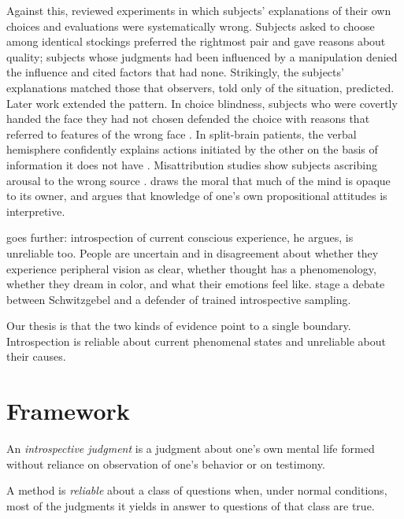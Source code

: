 \documentclass{situationist-preprint}
\begin{document}
Against this, \citet{Nisbett1977} reviewed experiments in which subjects' explanations of their own choices and evaluations were systematically wrong. Subjects asked to choose among identical stockings preferred the rightmost pair and gave reasons about quality; subjects whose judgments had been influenced by a manipulation denied the influence and cited factors that had none. Strikingly, the subjects' explanations matched those that observers, told only of the situation, predicted. Later work extended the pattern. In choice blindness, subjects who were covertly handed the face they had not chosen defended the choice with reasons that referred to features of the wrong face \citep{Johansson2005}. In split-brain patients, the verbal hemisphere confidently explains actions initiated by the other on the basis of information it does not have \citep{Gazzaniga1978}. Misattribution studies show subjects ascribing arousal to the wrong source \citep{Schachter1962,Dutton1974}. \citet{Wilson2002} draws the moral that much of the mind is opaque to its owner, and \citet{Carruthers2011} argues that knowledge of one's own propositional attitudes is interpretive.

\citet{Schwitzgebel2008,Schwitzgebel2011} goes further: introspection of current conscious experience, he argues, is unreliable too. People are uncertain and in disagreement about whether they experience peripheral vision as clear, whether thought has a phenomenology, whether they dream in color, and what their emotions feel like. \citet{Hurlburt2007} stage a debate between Schwitzgebel and a defender of trained introspective sampling.

Our thesis is that the two kinds of evidence point to a single boundary. Introspection is reliable about current phenomenal states and unreliable about their causes.

\section{Framework}

\begin{definition}\label{d:intro}
An \emph{introspective judgment} is a judgment about one's own mental life formed without reliance on observation of one's behavior or on testimony.
\end{definition}

\begin{definition}[Reliability]\label{d:rel}
A method is \emph{reliable} about a class of questions when, under normal conditions, most of the judgments it yields in answer to questions of that class are true.
\end{definition}
\end{document}

